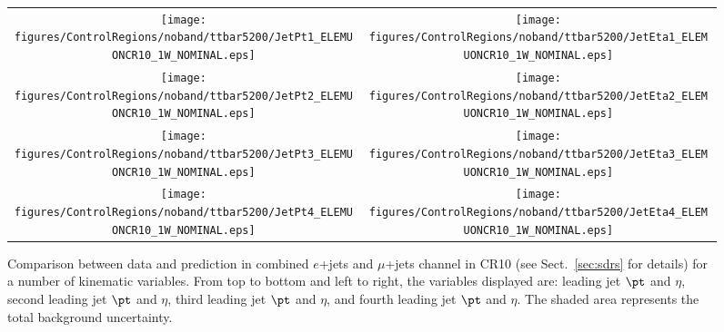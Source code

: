\clearpage
\begin{figure}[htbp]
\begin{center}
\begin{tabular}{cc}
%
\texttt{[image: figures/ControlRegions/noband/ttbar5200/JetPt1\_ELEMUONCR10\_1W\_NOMINAL.eps]} &
\texttt{[image: figures/ControlRegions/noband/ttbar5200/JetEta1\_ELEMUONCR10\_1W\_NOMINAL.eps]} \\
\texttt{[image: figures/ControlRegions/noband/ttbar5200/JetPt2\_ELEMUONCR10\_1W\_NOMINAL.eps]} &
\texttt{[image: figures/ControlRegions/noband/ttbar5200/JetEta2\_ELEMUONCR10\_1W\_NOMINAL.eps]} \\
\texttt{[image: figures/ControlRegions/noband/ttbar5200/JetPt3\_ELEMUONCR10\_1W\_NOMINAL.eps]} &
\texttt{[image: figures/ControlRegions/noband/ttbar5200/JetEta3\_ELEMUONCR10\_1W\_NOMINAL.eps]} \\
\texttt{[image: figures/ControlRegions/noband/ttbar5200/JetPt4\_ELEMUONCR10\_1W\_NOMINAL.eps]}  &
\texttt{[image: figures/ControlRegions/noband/ttbar5200/JetEta4\_ELEMUONCR10\_1W\_NOMINAL.eps]}  \\
\end{tabular}\caption{\small {Comparison between data and prediction in combined $e$+jets and $\mu$+jets channel in CR10 (see Sect.~\ref{sec:sdrs} for details) 
for a number of kinematic variables. From top to bottom and left to right, the variables displayed are: leading jet $\pt$ and $\eta$,  second leading jet $\pt$ and $\eta$,
third leading jet $\pt$ and $\eta$, and fourth leading jet $\pt$ and $\eta$. The shaded area represents the total background uncertainty.}}
\label{fig:ELEMUONCR10_2}
\end{center}
\end{figure}                                                                             

